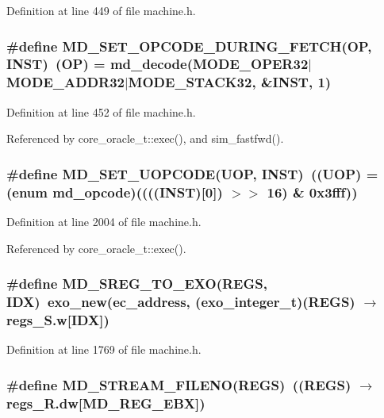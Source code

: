 Definition at line 449 of file machine.h.
\subsubsection[{MD\_\-SET\_\-OPCODE\_\-DURING\_\-FETCH}]{\setlength{\rightskip}{0pt plus 5cm}\#define MD\_\-SET\_\-OPCODE\_\-DURING\_\-FETCH(OP, \/  INST)~(OP) = md\_\-decode(MODE\_\-OPER32$|$MODE\_\-ADDR32$|$MODE\_\-STACK32, \&INST, 1)}\label{machine_8h_7d127ef0f1f9750b48bb0085c83af02a}




Definition at line 452 of file machine.h.

Referenced by core\_\-oracle\_\-t::exec(), and sim\_\-fastfwd().
\subsubsection[{MD\_\-SET\_\-UOPCODE}]{\setlength{\rightskip}{0pt plus 5cm}\#define MD\_\-SET\_\-UOPCODE(UOP, \/  INST)~((UOP) = (enum {\bf md\_\-opcode})((((INST)[0]) $>$$>$ 16) \& 0x3fff))}\label{machine_8h_3e3e4e68ba5623a3a048d9719c57be70}




Definition at line 2004 of file machine.h.

Referenced by core\_\-oracle\_\-t::exec().
\subsubsection[{MD\_\-SREG\_\-TO\_\-EXO}]{\setlength{\rightskip}{0pt plus 5cm}\#define MD\_\-SREG\_\-TO\_\-EXO(REGS, \/  IDX)~exo\_\-new(ec\_\-address, ({\bf exo\_\-integer\_\-t})(REGS) $\rightarrow$ regs\_\-S.w[IDX])}\label{machine_8h_4db1bfc53308fafecb48648e6640df90}




Definition at line 1769 of file machine.h.
\subsubsection[{MD\_\-STREAM\_\-FILENO}]{\setlength{\rightskip}{0pt plus 5cm}\#define MD\_\-STREAM\_\-FILENO(REGS)~((REGS) $\rightarrow$ regs\_\-R.dw[MD\_\-REG\_\-EBX])}\label{machine_8h_85f80c8824582c21955972b4f14de5c0}




